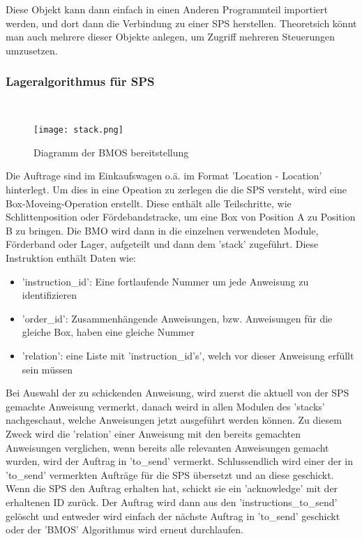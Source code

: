Diese Objekt kann dann einfach in einen Anderen Programmteil importiert werden, und dort dann die Verbindung zu einer SPS herstellen. Theoretsich könnt man auch mehrere dieser Objekte anlegen, um Zugriff mehreren Steuerungen umzusetzen.

\subsubsection{Lageralgorithmus für SPS}\mbox{}\\

\begin{wrapfigure}{R}{0.6\textwidth}
    \centering
    \texttt{[image: stack.png]}
    \caption{Diagramm der BMOS bereitstellung}
\end{wrapfigure}

Die Auftrage sind im Einkaufswagen o.ä. im Format 'Location -\> Location' hinterlegt. Um dies in eine Opeation zu zerlegen die die SPS versteht, wird eine Box-Moveing-Operation erstellt. Diese enthält alle Teilschritte, wie Schlittenposition oder Fördebandstracke, um eine Box von Position A zu Position B zu bringen. 
Die BMO wird dann in die einzelnen verwendeten Module, Förderband oder Lager, aufgeteilt und dann dem 'stack' zugeführt. Diese Instruktion enthält Daten wie:
\begin{itemize}
    \item 'instruction\_id': Eine fortlaufende Nummer um jede Anweisung zu identifizieren
    \item 'order\_id': Zusammenhängende Anweisungen, bzw. Anweisungen für die gleiche Box, haben eine gleiche Nummer
    \item 'relation': eine Liste mit 'instruction\_id's', welch vor dieser Anweisung erfüllt sein müssen
\end{itemize} 

Bei Auswahl der zu schickenden Anweisung, wird zuerst die aktuell von der SPS gemachte Anweisung vermerkt, danach weird in allen Modulen des 'stacks' nachgeschaut, welche Anweisungen jetzt ausgeführt werden können. Zu diesem Zweck wird die 'relation' einer Anweisung mit den bereits gemachten Anweisungen verglichen, wenn bereits alle relevanten Anweisungen gemacht wurden, wird der Auftrag in 'to\_send' vermerkt. Schlussendlich wird einer der in 'to\_send' vermerkten Aufträge für die SPS übersetzt und an diese geschickt. 
Wenn die SPS den Auftrag erhalten hat, schickt sie ein 'acknowledge' mit der erhaltenen ID zurück. Der Auftrag wird dann aus den 'instructions\_to\_send' gelöscht und entweder wird einfach der nächste Auftrag in 'to\_send' geschickt oder der 'BMOS' Algorithmus wird erneut durchlaufen.


